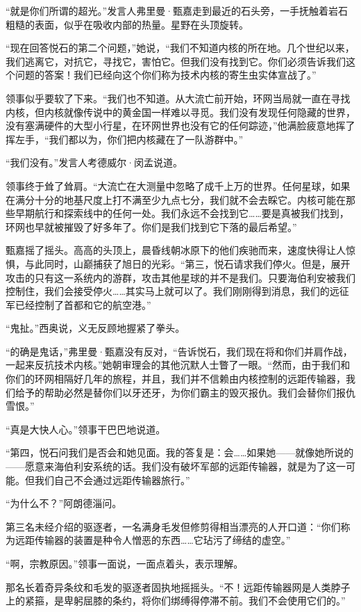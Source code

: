 \documentclass[AutoFakeBold=true]{book}
\begin{document}
``就是你们所谓的超光。''发言人弗里曼·甄嘉走到最近的石头旁，一手抚触着岩石粗糙的表面，似乎在吸收内部的热量。星野在头顶旋转。

``现在回答悦石的第二个问题，''她说，``我们不知道内核的所在地。几个世纪以来，我们逃离它，对抗它，寻找它，害怕它。但我们没有找到它。你们必须告诉我们这个问题的答案！我们已经向这个你们称为技术内核的寄生虫实体宣战了。''

领事似乎要软了下来。``我们也不知道。从大流亡前开始，环网当局就一直在寻找内核，但内核就像传说中的黄金国一样难以寻觅。我们没有发现任何隐藏的世界，没有塞满硬件的大型小行星，在环网世界也没有它的任何踪迹，''他满脸疲意地挥了挥左手，``我们都以为，你们把内核藏在了一队游群中。''

``我们没有。''发言人考德威尔·闵孟说道。

领事终于耸了耸肩。``大流亡在大测量中忽略了成千上万的世界。任何星球，如果在满分十分的地基尺度上打不满至少九点七分，我们就不会去睬它。内核可能在那些早期航行和探索线中的任何一处。我们永远不会找到它……要是真被我们找到，环网也早就被摧毁了好多年了。你们是我们找到它下落的最后希望。''

甄嘉摇了摇头。高高的头顶上，晨昏线朝冰原下的他们疾驰而来，速度快得让人惊惧，与此同时，山巅捕获了旭日的光彩。``第三，悦石请求我们停火。但是，展开攻击的只有这一系统内的游群，攻击其他星球的并不是我们。只要海伯利安被我们控制住，我们会接受停火……其实马上就可以了。我们刚刚得到消息，我们的远征军已经控制了首都和它的航空港。''

``鬼扯。''西奥说，义无反顾地握紧了拳头。

``的确是鬼话，''弗里曼·甄嘉没有反对，``告诉悦石，我们现在将和你们并肩作战，一起来反抗技术内核。''她朝审理会的其他沉默人士瞥了一眼。``然而，由于我们和你们的环网相隔好几年的旅程，并且，我们并不信赖由内核控制的远距传输器，我们给予的帮助必然是替你们以牙还牙，为你们霸主的毁灭报仇。我们会替你们报仇雪恨。''

``真是大快人心。''领事干巴巴地说道。

``第四，悦石问我们是否会和她见面。我的答复是：会……如果她——就像她所说的——愿意来海伯利安系统的话。我们没有破坏军部的远距传输器，就是为了这一可能。但我们自己不会通过远距传输器旅行。''

``为什么不？''阿朗德淄问。

第三名未经介绍的驱逐者，一名满身毛发但修剪得相当漂亮的人开口道：``你们称为远距传输器的装置是种令人憎恶的东西……它玷污了缔结的虚空。''

``啊，宗教原因。''领事一面说，一面点着头，表示理解。

那名长着奇异条纹和毛发的驱逐者固执地摇摇头。``不！远距传输器网是人类脖子上的紧箍，是卑躬屈膝的条约，将你们绑缚得停滞不前。我们不会使用它们的。''
\end{document}
